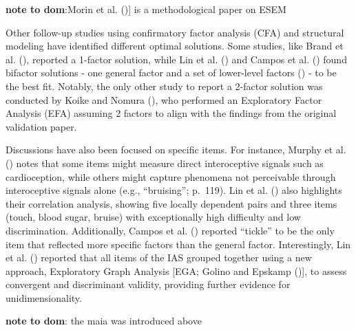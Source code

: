\documentclass[
  man,
  floatsintext,
  longtable,
  nolmodern,
  notxfonts,
  notimes,
  colorlinks=true,linkcolor=blue,citecolor=blue,urlcolor=blue]{apa7}
\begin{document}
\textbf{note to dom}:Morin et al. (){]} is
a methodological paper on ESEM

Other follow-up studies using confirmatory factor analysis (CFA) and
structural modeling have identified different optimal solutions. Some
studies, like Brand et al. (), reported a
1-factor solution, while Lin et al. () and
Campos et al. () found bifactor solutions
- one general factor and a set of lower-level factors
() - to be
the best fit. Notably, the only other study to report a 2-factor
solution was conducted by Koike and Nomura
(), who performed an Exploratory Factor
Analysis (EFA) assuming 2 factors to align with the findings from the
original validation paper.

Discussions have also been focused on specific items. For instance,
Murphy et al. () notes that some items
might measure direct interoceptive signals such as cardioception, while
others might capture phenomena not perceivable through interoceptive
signals alone (e.g., ``bruising''; p.~119). Lin et al.
() also highlights their correlation
analysis, showing five locally dependent pairs and three items (touch,
blood sugar, bruise) with exceptionally high difficulty and low
discrimination. Additionally, Campos et al.
() reported ``tickle'' to be the only
item that reflected more specific factors than the general factor.
Interestingly, Lin et al. () reported that
all items of the IAS grouped together using a new approach, Exploratory
Graph Analysis {[}EGA; Golino and Epskamp
(){]}, to assess convergent
and discriminant validity, providing further evidence for
unidimensionality.

\textbf{note to dom}: the maia was introduced above
\end{document}
